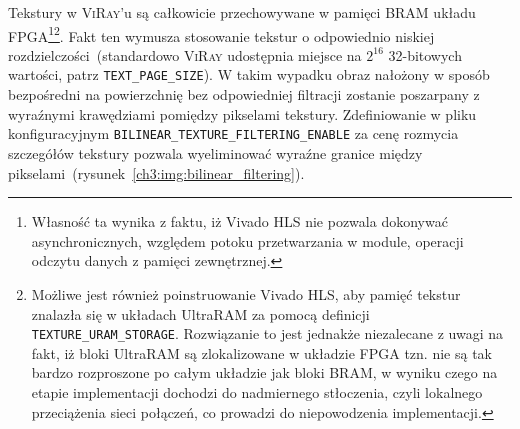 \begin{enumerate}

Tekstury w \textsc{ViRay}'u są całkowicie przechowywane w pamięci BRAM układu FPGA\footnote{Własność ta wynika z faktu, iż Vivado HLS nie pozwala dokonywać asynchronicznych, względem potoku przetwarzania w module, operacji odczytu danych z pamięci zewnętrznej.}\footnote{Możliwe jest również poinstruowanie Vivado HLS, aby pamięć tekstur znalazła się w układach UltraRAM za pomocą definicji \texttt{TEXTURE\_URAM\_STORAGE}. Rozwiązanie to jest jednakże niezalecane z uwagi na fakt, iż bloki UltraRAM są zlokalizowane w układzie FPGA tzn. nie są tak bardzo rozproszone po całym układzie jak bloki BRAM, w wyniku czego na etapie implementacji dochodzi do nadmiernego stłoczenia, czyli lokalnego przeciążenia sieci połączeń, co prowadzi do niepowodzenia implementacji.}. Fakt ten wymusza stosowanie tekstur o odpowiednio niskiej rozdzielczości~(standardowo \textsc{ViRay} udostępnia miejsce na $2^{16}$ 32-bitowych wartości, patrz \texttt{TEXT\_PAGE\_SIZE}). W takim wypadku obraz nałożony w sposób bezpośredni na powierzchnię bez odpowiedniej filtracji zostanie poszarpany z wyraźnymi krawędziami pomiędzy pikselami tekstury. Zdefiniowanie w pliku konfiguracyjnym \texttt{BILINEAR\_TEXTURE\_FILTERING\_ENABLE} za cenę rozmycia szczegółów tekstury pozwala wyeliminować wyraźne granice między pikselami~(rysunek~\ref{ch3:img:bilinear_filtering}). 



\end{enumerate}
